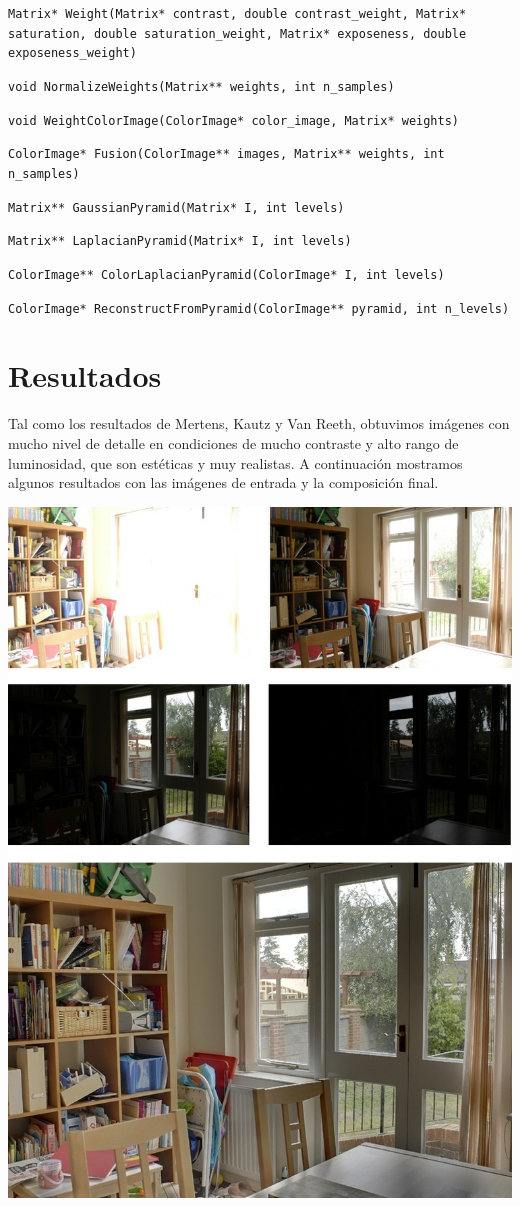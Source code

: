 \documentclass[a4paper,10pt]{article}
\begin{document}
            \texttt{Matrix* Weight(Matrix* contrast, double contrast\_weight, Matrix* saturation, double saturation\_weight, Matrix* exposeness, double exposeness\_weight)}

            \texttt{void NormalizeWeights(Matrix** weights, int n\_samples)}

            \texttt{void WeightColorImage(ColorImage* color\_image, Matrix* weights)}

            \texttt{ColorImage* Fusion(ColorImage** images, Matrix** weights, int n\_samples)}

            \texttt{Matrix** GaussianPyramid(Matrix* I, int levels)}

            \texttt{Matrix** LaplacianPyramid(Matrix* I, int levels)}

            \texttt{ColorImage** ColorLaplacianPyramid(ColorImage* I, int levels)}

            \texttt{ColorImage* ReconstructFromPyramid(ColorImage** pyramid, int n\_levels)}

    \section{Resultados}

        Tal como los resultados de Mertens, Kautz y Van Reeth, obtuvimos imágenes con mucho nivel de detalle en condiciones de mucho contraste y alto rango de luminosidad, que son estéticas y muy realistas. A continuación mostramos algunos resultados con las imágenes de entrada y la composición final.
        
        \includegraphics[width=\textwidth]{fused1.jpg}
        
\end{document}
